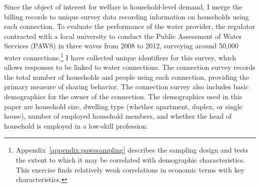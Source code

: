\documentclass[12pt]{article}
\begin{document}
Since the object of interest for welfare is household-level demand, I merge the billing records to unique survey data recording information on households using each connection.  To evaluate the performance of the water provider, the regulator contracted with a local university to conduct the Public Assessment of Water Services (PAWS) in three waves from 2008 to 2012, surveying around 50,000 water connections.\footnote{Appendix~\ref{appendix:pawssampling} describes the sampling design and tests the extent to which it may be correlated with demographic characteristics.  This exercise finds relatively weak correlations in economic terms with key characteristics.}  I have collected unique identifiers for this survey, which allows responses to be linked to water connections.  The connection survey records the total number of households and people using each connection, providing the primary measure of sharing behavior.  The connection survey also includes basic demographics for the owner of the connection.  The demographics used in this paper are household size, dwelling type (whether apartment, duplex, or single house), number of employed household members, and whether the head of household is employed in a low-skill profession.
\end{document}
